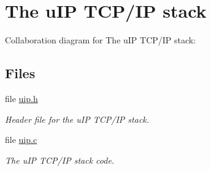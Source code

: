 \hypertarget{a00059}{
\section{The u\-IP TCP/IP stack}
\label{a00059}
}


Collaboration diagram for The u\-IP TCP/IP stack:

\subsection*{Files}
\begin{CompactItemize}
\item 
file \hyperlink{a00054}{uip.h}
\begin{CompactList}\small\item\em Header file for the u\-IP TCP/IP stack. \item\end{CompactList}

\item 
file \hyperlink{a00053}{uip.c}
\begin{CompactList}\small\item\em The u\-IP TCP/IP stack code. \item\end{CompactList}

\end{CompactItemize}
